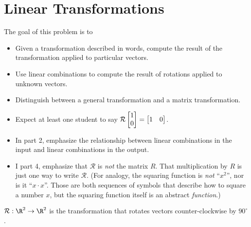 	\bookonlynewpage
\section*{Linear Transformations}
\vspace{-1.5em}

	\question
	\begin{annotation}
		\begin{goals}

			The goal of this problem is to
			\begin{itemize}
				\item Given a transformation described in words, compute the result
					of the transformation applied to particular vectors.
				\item Use linear combinations to compute the result of rotations applied
					to unknown vectors.
				\item Distinguish between a general transformation and a matrix transformation.
			\end{itemize}
		\end{goals}

		\begin{notes}
			\begin{itemize}
				\item Expect at least one student to say $\mathcal R\mat{1\\0}=\mat{1&0}$.
				\item In part 2, emphasize the relationship between linear combinations
					in the input and linear combinations in the output.
				\item I part 4, emphasize that $\mathcal R$ is \emph{not} the matrix $R$.
					That multiplication by $R$ is just one way to write $\mathcal R$.
					(For analogy, the squaring function is \emph{not} ``$x^2$'', nor is it ``$x\cdot x$''.
					Those are both sequences of symbols that describe how to square a number $x$, but
					the squaring function itself is an abstract \emph{function}.)
					
			\end{itemize}
		\end{notes}
	\end{annotation}
	$\mathcal R:\R^2\to\R^2$ is the transformation that rotates vectors counter-clockwise
	by $90^\circ$.
